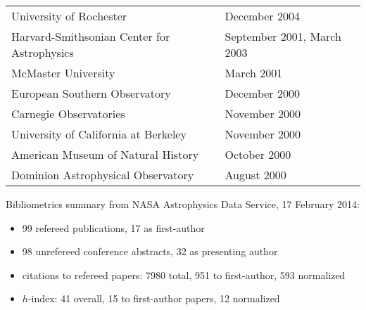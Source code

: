 \documentclass[12pt]{article}
\begin{document}
\begin{tabular}{p{12cm}l}
University of Rochester& December 2004\\
Harvard-Smithsonian Center for Astrophysics& September 2001, March 2003\\
McMaster University& March 2001\\
European Southern Observatory& December 2000\\
Carnegie Observatories& November 2000\\
University of California at Berkeley& November 2000\\
American Museum of Natural History& October 2000\\
Dominion Astrophysical Observatory& August 2000\\

\end{tabular}

\clearpage

\begin{publications}
Bibliometrics summary from NASA Astrophysics Data Service, 17 February 2014:
\begin{itemize}
\item 99 refereed publications, 17 as first-author
\item 98 unrefereed conference abstracts, 32 as presenting author
\item citations to refereed papers: 7980 total,  951 to first-author, 593 normalized
\item $h$-index: 41 overall, 15 to first-author papers, 12 normalized
\end{itemize}

\printbibliography[title={Refereed publications},keyword=ref]

\setcounter{papers}{0}
\printbibliography[title={Conference presentations},keyword=unref]


\end{publications}
\end{document}
